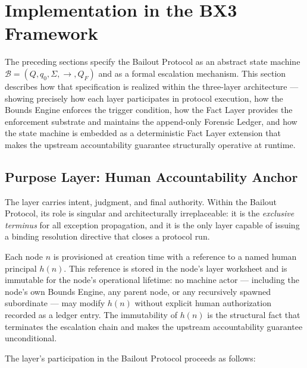 \section{Implementation in the BX3 Framework}\label{sec:implementation}

The preceding sections specify the Bailout Protocol as an abstract state machine $\mathcal{B} = (Q, q_0, \Sigma, \rightarrow, Q_F)$ and as a formal escalation mechanism. This section describes how that specification is realized within the \bxthree{} three-layer architecture — showing precisely how each layer participates in protocol execution, how the Bounds Engine enforces the trigger condition, how the Fact Layer provides the enforcement substrate and maintains the append-only Forensic Ledger, and how the state machine is embedded as a deterministic Fact Layer extension that makes the upstream accountability guarantee structurally operative at runtime.

\subsection{Purpose Layer: Human Accountability Anchor}\label{sec:purpose-layer}

The \purpose{} layer carries intent, judgment, and final authority. Within the Bailout Protocol, its role is singular and architecturally irreplaceable: it is the \emph{exclusive terminus} for all exception propagation, and it is the only layer capable of issuing a binding resolution directive that closes a protocol run.

Each \bxthree{} node $n$ is provisioned at creation time with a reference to a named human principal $h(n)$. This reference is stored in the node's \purpose{} layer worksheet and is immutable for the node's operational lifetime: no machine actor — including the node's own Bounds Engine, any parent node, or any recursively spawned subordinate — may modify $h(n)$ without explicit human authorization recorded as a ledger entry. The immutability of $h(n)$ is the structural fact that terminates the escalation chain and makes the upstream accountability guarantee unconditional.

The \purpose{} layer's participation in the Bailout Protocol proceeds as follows:

